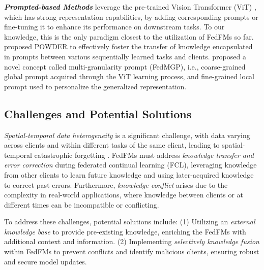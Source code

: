 \textbf{\textit{Prompted-based Methods}} leverage the pre-trained Vision Transformer (ViT) \cite{dosovitskiy2020image}, which has strong representation capabilities, by adding corresponding prompts or fine-tuning it to enhance its performance on downstream tasks. To our knowledge, this is the only paradigm closest to the utilization of FedFMs so far. \citet{piaofederated} proposed POWDER 
to effectively foster the transfer of knowledge encapsulated in prompts between various sequentially learned tasks and clients. \citet{yu2024personalized} proposed a novel concept called multi-granularity prompt (FedMGP), i.e., coarse-grained global prompt acquired through the ViT learning process, and fine-grained local prompt used to personalize the generalized representation.




\subsection{Challenges and Potential Solutions}

\textit{Spatial-temporal data heterogeneity} is a significant challenge, with data varying across clients and within different tasks of the same client, leading to spatial-temporal catastrophic forgetting \cite{yang2024federatedcl}.
FedFMs must address \textit{knowledge transfer and error correction} during federated continual learning (FCL), leveraging knowledge from other clients to learn future knowledge and using later-acquired knowledge to correct past errors. Furthermore, \textit{knowledge conflict} arises due to the complexity in real-world applications, where knowledge between clients or at different times can be incompatible or conflicting.

To address these challenges,  potential solutions include: (1) Utilizing an \textit{external knowledge base} to provide pre-existing knowledge, enriching the FedFMs with additional context and information. (2) Implementing \textit{selectively knowledge fusion} within FedFMs to prevent conflicts and identify malicious clients, ensuring robust and secure model updates.


